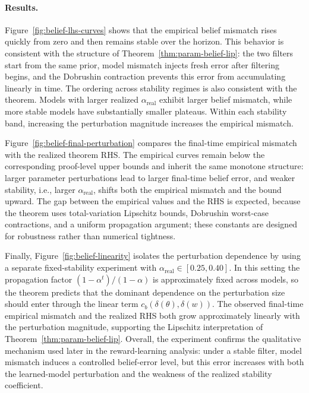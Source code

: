 \documentclass[10pt]{article} %
\theoremstyle{plain}
\theoremstyle{definition}
\theoremstyle{remark}
\begin{document}
\paragraph{Results.}
Figure~\ref{fig:belief-lhs-curves} shows that the empirical belief mismatch rises quickly from zero and then remains stable over the horizon. This behavior is consistent with the structure of Theorem~\ref{thm:param-belief-lip}: the two filters start from the same prior, model mismatch injects fresh error after filtering begins, and the Dobrushin contraction prevents this error from accumulating linearly in time. The ordering across stability regimes is also consistent with the theorem. Models with larger realized \(\alpha_{\mathrm{real}}\) exhibit larger belief mismatch, while more stable models have substantially smaller plateaus. Within each stability band, increasing the perturbation magnitude increases the empirical mismatch.

Figure~\ref{fig:belief-final-perturbation} compares the final-time empirical mismatch with the realized theorem RHS. The empirical curves remain below the corresponding proof-level upper bounds and inherit the same monotone structure: larger parameter perturbations lead to larger final-time belief error, and weaker stability, i.e., larger \(\alpha_{\mathrm{real}}\), shifts both the empirical mismatch and the bound upward. The gap between the empirical values and the RHS is expected, because the theorem uses total-variation Lipschitz bounds, Dobrushin worst-case contractions, and a uniform propagation argument; these constants are designed for robustness rather than numerical tightness.

Finally, Figure~\ref{fig:belief-linearity} isolates the perturbation dependence by using a separate fixed-stability experiment with \(\alpha_{\mathrm{real}}\in[0.25,0.40]\). In this setting the propagation factor \((1-\alpha^t)/(1-\alpha)\) is approximately fixed across models, so the theorem predicts that the dominant dependence on the perturbation size should enter through the linear term \(c_b(\delta(\theta),\delta(w))\). The observed final-time empirical mismatch and the realized RHS both grow approximately linearly with the perturbation magnitude, supporting the Lipschitz interpretation of Theorem~\ref{thm:param-belief-lip}. Overall, the experiment confirms the qualitative mechanism used later in the reward-learning analysis: under a stable filter, model mismatch induces a controlled belief-error level, but this error increases with both the learned-model perturbation and the weakness of the realized stability coefficient.
\end{document}
